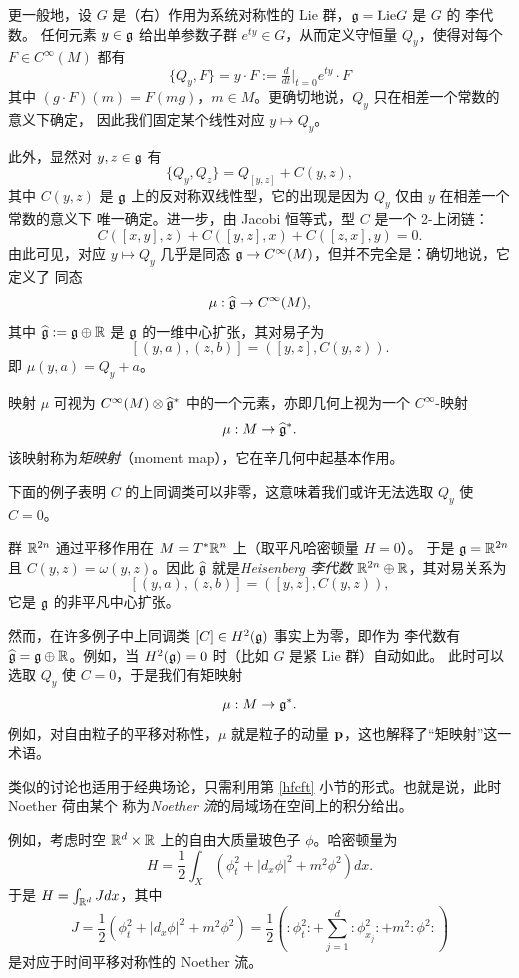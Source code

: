 更一般地，设 $G$ 是（右）作用为系统对称性的 Lie 群，$\g={\rm Lie}G$ 是 $G$ 的 李代数。
任何元素 $y\in \g$ 给出单参数子群 $e^{ty}\in G$，从而定义守恒量 $Q_y$，使得对每个
$F\in C^\infty(M)$ 都有
$$
\lbrace Q_y,F\rbrace=y\cdot F:=\tfrac{d}{dt}|_{t=0} e^{ty}\cdot F
$$
其中 $(g\cdot F)(m)=F(mg)$，$m\in M$。更确切地说，$Q_y$ 只在相差一个常数的意义下确定，
因此我们固定某个线性对应 $y\mapsto Q_y$。

此外，显然对 $y,z\in \g$ 有
$$
\lbrace Q_y,Q_z\rbrace =Q_{[y,z]}+C(y,z),
$$
其中 $C(y,z)$ 是 $\g$ 上的反对称双线性型，它的出现是因为 $Q_y$ 仅由 $y$ 在相差一个常数的意义下
唯一确定。进一步，由 Jacobi 恒等式，型 $C$ 是一个 2-上闭链：
$$
C([x,y],z)+C([y,z],x)+C([z,x],y)=0.
$$
由此可见，对应 $y\mapsto Q_y$ 几乎是同态 $\g\to C^\infty(M)$，但并不完全是：确切地说，它定义了
同态
$$
\mu: \widehat \g\to C^\infty(M),
$$ 
其中 $\widehat \g:=\g\oplus \Bbb R$ 是 $\g$ 的一维中心扩张，其对易子为
$$
[(y,a),(z,b)]=([y,z],C(y,z)).
$$
即 $\mu(y,a)=Q_y+a$。

映射 $\mu$ 可视为 $C^\infty(M)\otimes \widehat\g^*$ 中的一个元素，亦即几何上视为一个
$C^\infty$-映射
$$
\mu: M\to \widehat\g^*.
$$ 
该映射称为\emph{矩映射}（moment map），它在辛几何中起基本作用。

下面的例子表明 $C$ 的上同调类可以非零，这意味着我们或许无法选取 $Q_y$ 使 $C=0$。

\begin{example} 群 $\Bbb R^{2n}$ 通过平移作用在 $M=T^*\Bbb R^n$ 上（取平凡哈密顿量 $H=0$）。
于是 $\g=\Bbb R^{2n}$ 且 $C(y,z)=\omega(y,z)$。因此 $\widehat \g$ 就是\emph{Heisenberg 李代数}
$\Bbb R^{2n}\oplus \Bbb R$，其对易关系为
 $$
[(y,a),(z,b)]=([y,z],C(y,z)),
$$
它是 $\g$ 的非平凡中心扩张。
\end{example} 

然而，在许多例子中上同调类 $[C]\in H^2(\g)$ 事实上为零，即作为 李代数有
$\widehat \g=\g\oplus \Bbb R$。例如，当 $H^2(\g)=0$ 时（比如 $G$ 是紧 Lie 群）自动如此。
此时可以选取 $Q_y$ 使 $C=0$，于是我们有矩映射
$$
\mu: M\to \g^*.
$$
例如，对自由粒子的平移对称性，$\mu$ 就是粒子的动量 $\bold p$，这也解释了“矩映射”这一术语。

类似的讨论也适用于经典场论，只需利用第 \ref{hfcft} 小节的形式。也就是说，此时 Noether 荷由某个
称为\emph{Noether 流}的局域场在空间上的积分给出。

例如，考虑时空 $\Bbb R^d\times \Bbb R$ 上的自由大质量玻色子 $\phi$。哈密顿量为
$$
H=\frac{1}{2}\int_{X} (\phi_t^2+|d_x\phi|^2+m^2\phi^2)dx.
$$
于是 $H=\int_{\Bbb R^d} Jdx$，其中
\begin{equation}\label{kertime}
J=\frac{1}{2}(\phi_t^2+|d_x\phi|^2+m^2\phi^2)=\frac{1}{2}(:\phi_t^2:+\sum_{j=1}^d:\phi_{x_j}^2:+m^2:\phi^2:)
\end{equation} 
是对应于时间平移对称性的 Noether 流。

